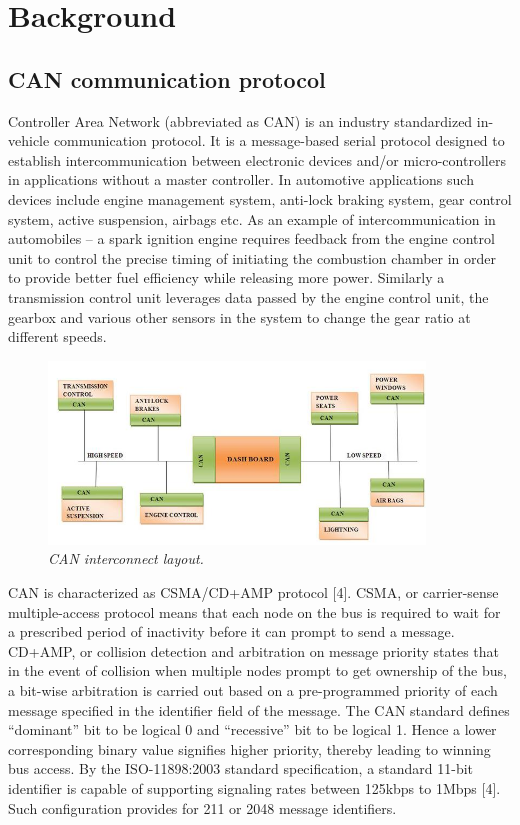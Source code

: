 \documentclass{article}
\begin{document}
\section{Background}
\subsection{CAN communication protocol}
Controller Area Network (abbreviated as CAN) is an industry standardized in-vehicle communication protocol. It is a message-based serial protocol designed to establish intercommunication between electronic devices and/or micro-controllers in applications without a master controller. In automotive applications such devices include engine management system, anti-lock braking system, gear control system, active suspension, airbags etc. As an example of intercommunication in automobiles – a spark ignition engine requires feedback from the engine control unit to control the precise timing of initiating the combustion chamber in order to provide better fuel efficiency while releasing more power. Similarly a transmission control unit leverages data passed by the engine control unit, the gearbox and various other sensors in the system to change the gear ratio at different speeds.


\begin{figure}[!ht]
\centering 
\includegraphics[width=10cm]{fig_2.png}
\caption{\small \sl CAN interconnect layout.}  
\end{figure}

\noindent CAN is characterized as CSMA/CD+AMP protocol [4]. CSMA, or carrier-sense multiple-access protocol means that each node on the bus is required to wait for a prescribed period of inactivity before it can prompt to send a message. CD+AMP, or collision detection and arbitration on message priority states that in the event of collision when multiple nodes prompt to get ownership of the bus, a bit-wise arbitration is carried out based on a pre-programmed priority of each message specified in the identifier field of the message. The CAN standard defines “dominant” bit to be logical 0 and “recessive” bit to be logical 1. Hence a lower corresponding binary value signifies higher priority, thereby leading to winning bus access. By the ISO-11898:2003 standard specification, a standard 11-bit identifier is capable of supporting signaling rates between 125kbps to 1Mbps [4]. Such configuration provides for 211 or 2048 message identifiers. \\
\end{document}
